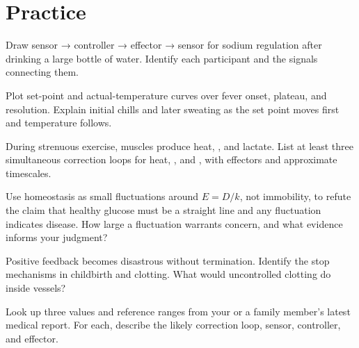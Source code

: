 \section*{Practice}

\begin{sikaoti}
\item Draw sensor → controller → effector → sensor for sodium regulation after drinking a large bottle of water. Identify each participant and the signals connecting them.
\item Plot set-point and actual-temperature curves over fever onset, plateau, and resolution. Explain initial chills and later sweating as the set point moves first and temperature follows.
\item During strenuous exercise, muscles produce heat, , and lactate. List at least three simultaneous correction loops for heat, , and , with effectors and approximate timescales.
\item Use homeostasis as small fluctuations around $E=D/k$, not immobility, to refute the claim that healthy glucose must be a straight line and any fluctuation indicates disease. How large a fluctuation warrants concern, and what evidence informs your judgment?
\item Positive feedback becomes disastrous without termination. Identify the stop mechanisms in childbirth and clotting. What would uncontrolled clotting do inside vessels?
\item Look up three values and reference ranges from your or a family member's latest medical report. For each, describe the likely correction loop, sensor, controller, and effector.
\end{sikaoti}
